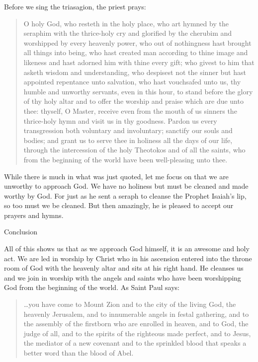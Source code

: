 \documentclass[
]{article}
\begin{document}
Before we sing the triasagion, the priest prays:

\begin{quote}
O holy God, who resteth in the holy place, who art hymned by the
seraphim with the thrice-holy cry and glorified by the cherubim and
worshipped by every heavenly power, who out of nothingness hast brought
all things into being, who hast created man according to thine image and
likeness and hast adorned him with thine every gift; who givest to him
that asketh wisdom and understanding, who despisest not the sinner but
hast appointed repentance unto salvation, who hast vouchsafed unto us,
thy humble and unworthy servants, even in this hour, to stand before the
glory of thy holy altar and to offer the worship and praise which are
due unto thee: thyself, O Master, receive even from the mouth of us
sinners the thrice-holy hymn and visit us in thy goodness. Pardon us
every transgression both voluntary and involuntary; sanctify our souls
and bodies; and grant us to serve thee in holiness all the days of our
life, through the intercession of the holy Theotokos and of all the
saints, who from the beginning of the world have been well-pleasing unto
thee.
\end{quote}

While there is much in what was just quoted, let me focus on that we are
unworthy to approach God. We have no holiness but must be cleaned and
made worthy by God. For just as he sent a seraph to cleanse the Prophet
Isaiah's lip, so too must we be cleaned. But then amazingly, he is
pleased to accept our prayers and hymns.

Conclusion

All of this shows us that as we approach God himself, it is an awesome
and holy act. We are led in worship by Christ who in his ascension
entered into the throne room of God with the heavenly altar and sits at
his right hand. He cleanses us and we join in worship with the angels
and saints who have been worshipping God from the beginning of the
world. As Saint Paul says:

\begin{quote}
\ldots you have come to Mount Zion and to the city of the living God,
the heavenly Jerusalem, and to innumerable angels in festal gathering,
and to the assembly of the firstborn who are enrolled in heaven, and to
God, the judge of all, and to the spirits of the righteous made perfect,
and to Jesus, the mediator of a new covenant and to the sprinkled blood
that speaks a better word than the blood of Abel.
\end{quote}
\end{document}
